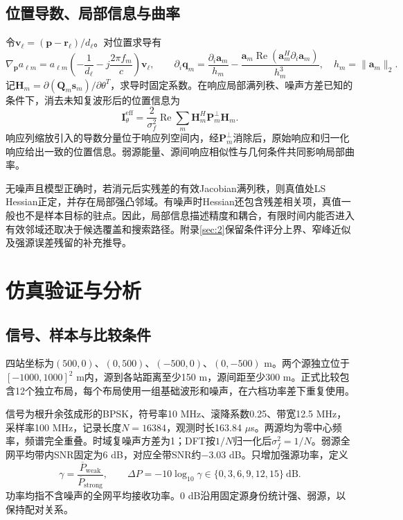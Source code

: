 \subsection{位置导数、局部信息与曲率}
令$\mathbf v_\ell=(\mathbf p-\mathbf r_\ell)/d_\ell$。对位置求导有
\begin{equation}
\nabla_{\mathbf p}a_{\ell m}=a_{\ell m}\left(-\frac1{d_\ell}-j\frac{2\pi f_m}{c}\right)\mathbf v_\ell,\qquad
\partial_i\mathbf q_m=\frac{\partial_i\mathbf a_m}{h_m}-\frac{\mathbf a_m\operatorname{Re}(\mathbf a_m^H\partial_i\mathbf a_m)}{h_m^3},
\quad h_m=\|\mathbf a_m\|_2.
\end{equation}
记$\mathbf H_m=\partial(\mathbf Q_m\mathbf s_m)/\partial\theta^T$，求导时固定系数。在响应局部满列秩、噪声方差已知的条件下，消去未知复波形后的位置信息为\cite{ref05,ref10}
\begin{equation}\label{eq:new-information}
\mathbf I_{\theta}^{\mathrm{eff}}=\frac{2}{\sigma_f^2}\operatorname{Re}\sum_m\mathbf H_m^H\mathbf P_m^\perp\mathbf H_m.
\end{equation}
响应列缩放引入的导数分量位于响应列空间内，经$\mathbf P_m^\perp$消除后，原始响应和归一化响应给出一致的位置信息。弱源能量、源间响应相似性与几何条件共同影响局部曲率。

无噪声且模型正确时，若消元后实残差的有效Jacobian满列秩，则真值处LS Hessian正定，并存在局部强凸邻域。有噪声时Hessian还包含残差相关项，真值一般也不是样本目标的驻点。因此，局部信息描述精度和耦合，有限时间内能否进入有效邻域还取决于候选覆盖和搜索路径。附录\ref{sec:2}保留条件评分上界、窄峰近似及强源误差残留的补充推导。

\section{仿真验证与分析}\label{sec:new-results}
\subsection{信号、样本与比较条件}
四站坐标为$(500,0)$、$(0,500)$、$(-500,0)$、$(0,-500)$ m。两个源独立位于$[-1000,1000]^2$ m内，源到各站距离至少150 m，源间距至少300 m。正式比较包含12个独立布局，每个布局使用一组基础波形和噪声，在六档功率差下重复使用。

信号为根升余弦成形的BPSK，符号率10 MHz、滚降系数0.25、带宽12.5 MHz，采样率100 MHz，记录长度$N=16384$，观测时长163.84 $\mu$s。两源均为零中心频率，频谱完全重叠。时域复噪声方差为1；DFT按$1/N$归一化后$\sigma_f^2=1/N$。弱源全网平均带内SNR固定为6 dB，对应全带SNR约$-3.03$ dB。只增加强源功率，定义
\begin{equation}
\gamma=\frac{\overline P_{\mathrm{weak}}}{\overline P_{\mathrm{strong}}},\qquad
\Delta P=-10\log_{10}\gamma\in\{0,3,6,9,12,15\}\ \mathrm{dB}.
\end{equation}
功率均指不含噪声的全网平均接收功率。0 dB沿用固定源身份统计强、弱源，以保持配对关系。

